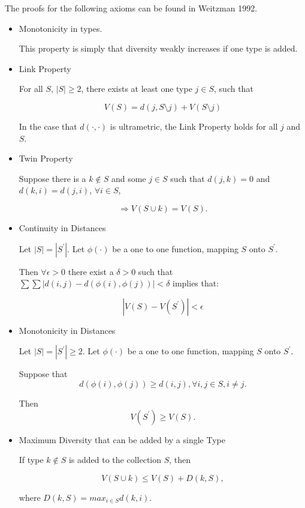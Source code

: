 \documentclass[12pt]{article}
\begin{document}
The proofs for the following axioms can be found in Weitzman 1992. 
\begin{itemize}
\item Monotonicity in types. 

This property is simply that diversity weakly increases if one type is added. 

\item Link Property

For all $S$, $|S|\geq 2$, there exists at least one type $j \in S$, such that

$$V(S)= d(j, S \setminus j) + V(S\setminus j)$$ 

In the case that $d(\cdot, \cdot)$ is ultrametric, the Link Property holds for all $j$ and $S$. 

\item Twin Property

Suppose there is a $k \not\in S$ and some $j \in S$ such that 
$d(j, k)=0$ and $d(k, i)=d(j, i)$, $\forall i \in S$, 

$$\Longrightarrow V(S\cup k)=V(S).$$ 

\item Continuity in Distances

Let $|S|=|S^{'}|$. Let $\phi(\cdot)$ be a one to one function, mapping $S$ onto $S^{'}$.

Then $\forall \epsilon > 0$ there exist a $\delta > 0$ such that $\sum\sum|d(i, j)-d(\phi(i), \phi(j))|<\delta$ implies that:

$$|V(S)-V(S^{'})|<\epsilon$$

\item Monotonicity in Distances

Let $|S|=|S^{'}|\geq 2$. Let $\phi(\cdot)$ be a one to one function, mapping $S$ onto $S^{'}$.

Suppose that
$$d(\phi(i), \phi(j)) \geq d(i, j), \forall i, j \in S, i\not=j.$$

Then
$$V(S^{'}) \geq V(S).$$

\item Maximum Diversity that can be added by a single Type

If type $k \not\in S$ is added to the collection $S$, then

$$V(S\cup k) \leq V(S) + D(k, S),$$

where $D(k, S)=max_{i \in S} d(k, i).$



\end{itemize}
\end{document}
